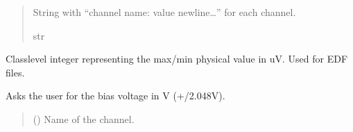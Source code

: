 \documentclass[letterpaper,10pt,english]{sphinxmanual}
\begin{document}
\begin{fulllineitems}
\begin{fulllineitems}
\begin{quote}
\begin{description}
\begin{itemize}
\end{itemize}

\sphinxAtStartPar
String with “channel name: value newline…” for each channel.

\sphinxAtStartPar
str

\end{description}\end{quote}

\end{fulllineitems}


\begin{fulllineitems}
\label{\detokenize{Setup.SetupOneDevice:Setup.SetupOneDevice.Setup_8401HR.Setup8401HR._PHYSICAL_BOUND_uV}}
\pysigstartsignatures
{}
\pysigstopsignatures
\sphinxAtStartPar
Class\sphinxhyphen{}level integer representing the max/\sphinxhyphen{}min physical value in uV. Used for     EDF files.

\end{fulllineitems}


\begin{fulllineitems}
\label{\detokenize{Setup.SetupOneDevice:Setup.SetupOneDevice.Setup_8401HR.Setup8401HR._SetBias}}
\pysigstartsignatures
{}
\pysigstopsignatures
\sphinxAtStartPar
Asks the user for the bias voltage in V (+/\sphinxhyphen{}2.048V).
\begin{quote}\begin{description}
\sphinxAtStartPar
{} () \textendash{} Name of the channel.


\end{description}
\end{quote}
\end{fulllineitems}
\end{fulllineitems}
\end{document}
